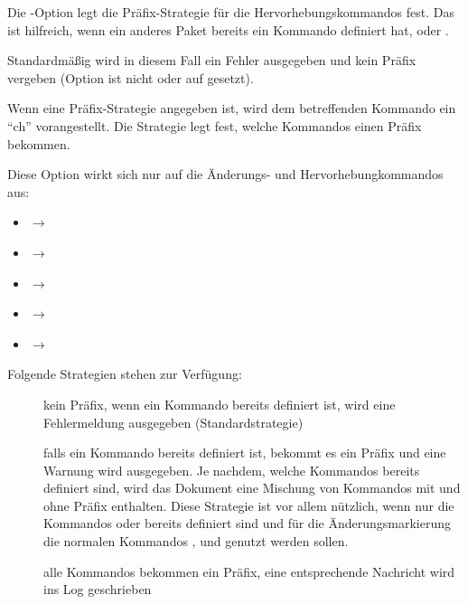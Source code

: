 
Die -Option legt die Präfix-Strategie für die Hervorhebungskommandos fest.
Das ist hilfreich, wenn ein anderes Paket bereits ein Kommando definiert hat, \zB {} oder .

Standardmäßig wird in diesem Fall ein Fehler ausgegeben und kein Präfix vergeben (Option ist nicht oder auf  gesetzt).

Wenn eine Präfix-Strategie angegeben ist, wird dem betreffenden Kommando ein "`ch"' vorangestellt.
Die Strategie legt fest, welche Kommandos einen Präfix bekommen.

Diese Option wirkt sich nur auf die Änderungs- und Hervorhebungkommandos aus:

\begin{itemize}
	\item {} \ensuremath{\to} 
	\item {} \ensuremath{\to} 
	\item {} \ensuremath{\to} 
	\item {} \ensuremath{\to} 
	\item {} \ensuremath{\to} 
\end{itemize}

Folgende Strategien stehen zur Verfügung:

\begin{description}
	\item [] kein Präfix, wenn ein Kommando bereits definiert ist, wird eine Fehlermeldung ausgegeben (Standardstrategie)
	\item [] falls ein Kommando bereits definiert ist, bekommt es ein Präfix und eine Warnung wird ausgegeben.
		Je nachdem, welche Kommandos bereits definiert sind, wird das Dokument eine Mischung von Kommandos mit und ohne Präfix enthalten.
		Diese Strategie ist vor allem nützlich, wenn nur die Kommandos  oder  bereits definiert sind und für die Änderungsmarkierung die normalen Kommandos ,  und  genutzt werden sollen.
	\item [] alle Kommandos bekommen ein Präfix, eine entsprechende Nachricht wird ins Log geschrieben
\end{description}

